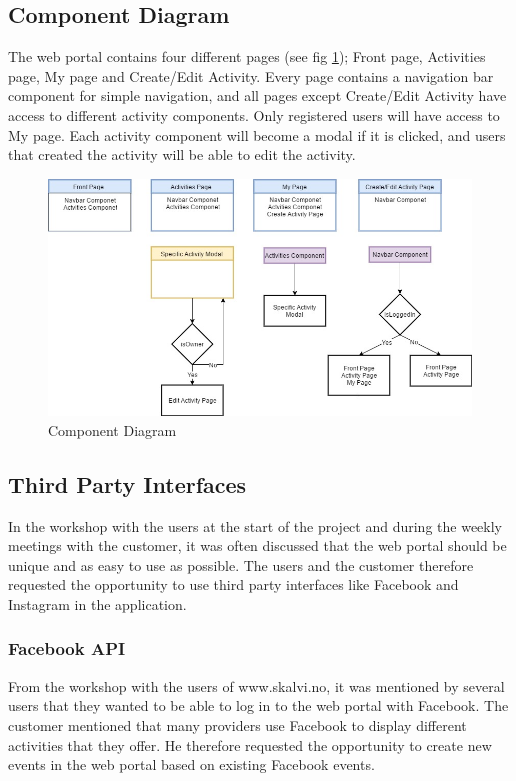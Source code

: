 \subsection{Component Diagram}
The web portal contains four different pages (see fig \ref{Component_Diagram}); Front page, Activities page, My page and Create/Edit Activity. Every page contains a navigation bar component for simple navigation, and all pages except Create/Edit Activity have access to different activity components. Only registered users will have access to My page. Each activity component will become a modal if it is clicked, and users that created the activity will be able to edit the activity.

\begin{figure}[H]
\centering
    \includegraphics[width=1.0\textwidth]{fig/Component_diagram}
\caption{Component Diagram}
\label{Component_Diagram}
\end{figure}




\subsection{Third Party Interfaces}
In the workshop with the users at the start of the project and during the weekly meetings with the customer, it was often discussed that the web portal should be unique and as easy to use as possible. The users and the customer therefore requested the opportunity to use third party interfaces like Facebook and Instagram in the application. 

\subsubsection{Facebook API}
From the workshop with the users of www.skalvi.no, it was mentioned by several users that they wanted to be able to log in to the web portal with Facebook.
The customer mentioned that many providers use Facebook to display different activities that they offer. He therefore requested the opportunity to create new events in the web portal based on existing Facebook events.  

